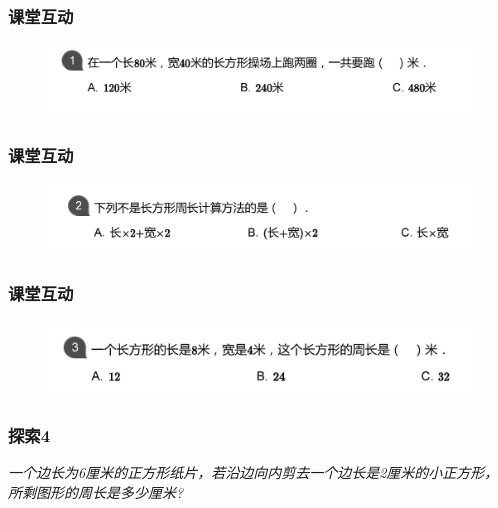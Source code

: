 \begin{frame}
    \frametitle{课堂互动}
    \begin{figure}[H] 
        \centering
        \includegraphics[width=1\textwidth]{./pics/Chapter_1/kthd1.png}
    \end{figure}
\end{frame}

\begin{frame}
    \frametitle{课堂互动}
    \begin{figure}[H] 
        \centering
        \includegraphics[width=1\textwidth]{./pics/Chapter_1/kthd2.png}
    \end{figure}
\end{frame}

\begin{frame}
    \frametitle{课堂互动}
    \begin{figure}[H] 
        \centering
        \includegraphics[width=1\textwidth]{./pics/Chapter_1/kthd3.png}
    \end{figure}
\end{frame}

\begin{frame}
    \frametitle{探索4}
    \textit{一个边长为6厘米的正方形纸片，若沿边向内剪去一个边长是2厘米的小正方形，所剩图形的周长是多少厘米?}
\end{frame}

